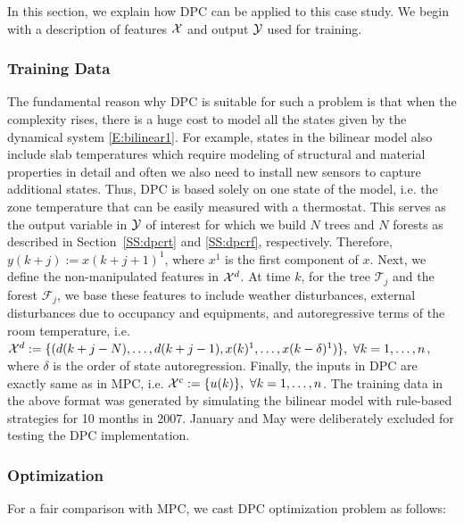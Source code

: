 In this section, we explain how DPC can be applied to this case study. We begin with a description of features $\mathcal{X}$ and output $\mathcal{Y}$ used for training.

\subsubsection{Training Data} 
\label{SSS:dpc_data}

The fundamental reason why DPC  is suitable for such a problem is that when the complexity rises, there is a huge cost to model all the states given by the dynamical system \eqref{E:bilinear1}. For example, states in the bilinear model also include slab temperatures which require modeling of structural and material properties in detail and often we also need to install new sensors to capture additional states. Thus, DPC is based solely on one state of the model, i.e. the zone temperature that can be easily measured with a thermostat. This serves as the output variable in $\mathcal{Y}$ of interest for which we build $N$ trees and $N$ forests as described in Section~\ref{SS:dpcrt} and \ref{SS:dpcrf}, respectively. Therefore, $y(k+j):=x(k+j+1)^1$, where $x^1$ is the first component of $x$.
Next, we define the non-manipulated features in $\mathcal{X}^d$. At time $k$, for the tree $\mathcal{T}_j$ and the forest $\mathcal{F}_j$, we base these features to include weather disturbances, external disturbances due to occupancy and equipments, and autoregressive terms of the room temperature, i.e.
$\mathcal{X}^d:=\{( d(k+j-N) ,\ldots,d(k+j-1), x(k)^1,\ldots, x(k-\delta)^1 )\},\ \forall k=1,\ldots,n$, where $\delta$ is the order of state autoregression.
Finally, the inputs in DPC are exactly same as in MPC, i.e. $\X^c:=\{u(k)\},\ \forall k=1,\ldots,n$.
The training data in the above format was generated by simulating the bilinear model with rule-based strategies for 10 months in 2007. January and May were deliberately excluded for testing the DPC implementation.
\subsubsection{Optimization} 
\label{SSS:dpc_opt}
For a fair comparison with MPC, we cast DPC optimization problem as follows:

